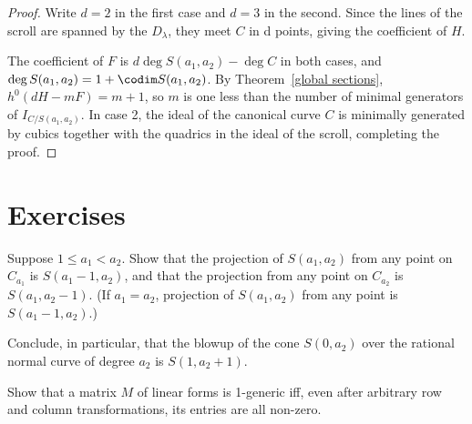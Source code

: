 \begin{proof} Write $d=2$ in the first case and $d=3$ in the second.
Since the lines of the scroll are spanned by the $D_\lambda$, they meet $C$ in d points, 
giving the coefficient of $H$. 

The coefficient of $F$ is $d\deg S(a_1,a_2) - \deg C$ in both cases, and 
$\deg S(a_1,a_2)= 1+ \codim  S(a_1,a_2)$. By Theorem~\ref{global sections}, 
$h^0(dH-mF) = m+1$, so $m$ is one less than the number of minimal generators
of $I_{C/S(a_1,a_2)}$. In case 2, the ideal of the canonical curve $C$ is minimally
generated by cubics together with  the quadrics in the ideal of the scroll, completing the proof. \end{proof}

%
\section{Exercises}

\begin{exercise}\label{special projections}
Suppose $1\leq a_1 < a_2$. Show that the projection of $S(a_1,a_2)$ from any point on $C_{a_1}$ is 
$S(a_1-1, a_2)$, and that the projection from any point on $C_{a_2}$ is $S(a_1, a_2-1)$. (If $a_1 = a_2$, projection of $S(a_1,a_2)$ from any point is $S(a_1-1, a_2)$.)

Conclude, in particular, that the blowup of the cone $S(0,a_2)$ over the rational normal curve of degree $a_2$ is $S(1,a_2+1)$.  
\end{exercise}

\begin{exercise}
Show that a matrix $M$ of linear forms is 1-generic iff, even after arbitrary row and column transformations, its entries are all non-zero.
\end{exercise}

